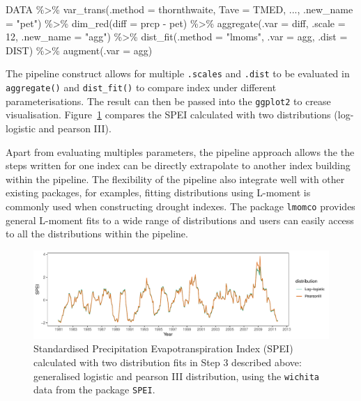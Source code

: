 \documentclass[
]{article}
\newenvironment{Shaded}{\begin{snugshade}}{\end{snugshade}}
\newcommand{\AttributeTok}[1]{\textcolor[rgb]{0.40,0.45,0.13}{#1}}
\newcommand{\DecValTok}[1]{\textcolor[rgb]{0.68,0.00,0.00}{#1}}
\newcommand{\FunctionTok}[1]{\textcolor[rgb]{0.28,0.35,0.67}{#1}}
\newcommand{\NormalTok}[1]{\textcolor[rgb]{0.00,0.23,0.31}{#1}}
\newcommand{\SpecialCharTok}[1]{\textcolor[rgb]{0.37,0.37,0.37}{#1}}
\newcommand{\StringTok}[1]{\textcolor[rgb]{0.13,0.47,0.30}{#1}}
\begin{document}
\begin{Shaded}
\begin{Highlighting}[]
\NormalTok{DATA }\SpecialCharTok{\%\textgreater{}\%} 
  \FunctionTok{var\_trans}\NormalTok{(}\AttributeTok{.method =}\NormalTok{ thornthwaite, }\AttributeTok{Tave =}\NormalTok{ TMED, ..., }\AttributeTok{.new\_name =} \StringTok{"pet"}\NormalTok{) }\SpecialCharTok{\%\textgreater{}\%}
  \FunctionTok{dim\_red}\NormalTok{(}\AttributeTok{diff =}\NormalTok{ prcp }\SpecialCharTok{{-}}\NormalTok{ pet) }\SpecialCharTok{\%\textgreater{}\%}
  \FunctionTok{aggregate}\NormalTok{(}\AttributeTok{.var =}\NormalTok{ diff, }\AttributeTok{.scale =} \DecValTok{12}\NormalTok{, }\AttributeTok{.new\_name =} \StringTok{"agg"}\NormalTok{) }\SpecialCharTok{\%\textgreater{}\%}
  \FunctionTok{dist\_fit}\NormalTok{(}\AttributeTok{.method =} \StringTok{"lmoms"}\NormalTok{, }\AttributeTok{.var =}\NormalTok{ agg, }\AttributeTok{.dist =}\NormalTok{ DIST) }\SpecialCharTok{\%\textgreater{}\%}
  \FunctionTok{augment}\NormalTok{(}\AttributeTok{.var =}\NormalTok{ agg)}
\end{Highlighting}
\end{Shaded}

The pipeline construct allows for multiple \texttt{.scales} and
\texttt{.dist} to be evaluated in \texttt{aggregate()} and
\texttt{dist\_fit()} to compare index under different parameterisations.
The result can then be passed into the \texttt{ggplot2} to crease
visualisation. Figure~\ref{fig-toy-example} compares the SPEI calculated
with two distributions (log-logistic and pearson III).

Apart from evaluating multiples parameters, the pipeline approach allows
the the steps written for one index can be directly extrapolate to
another index building within the pipeline. The flexibility of the
pipeline also integrate well with other existing packages, for examples,
fitting distributions using L-moment is commonly used when constructing
drought indexes. The package \texttt{lmomco} provides general L-moment
fits to a wide range of distributions and users can easily access to all
the distributions within the pipeline.

\begin{figure}

{\centering \includegraphics{paper_files/figure-pdf/fig-toy-example-1.pdf}

}

\caption{\label{fig-toy-example}Standardised Precipitation
Evapotranspiration Index (SPEI) calculated with two distribution fits in
Step 3 described above: generalised logistic and pearson III
distribution, using the \texttt{wichita} data from the package
\texttt{SPEI}.}

\end{figure}
\end{document}

